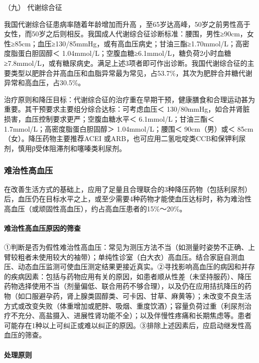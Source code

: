 \hypertarget{text00409.htmlux5cux23CHP17-3-1-8-9}{}
（九） 代谢综合征

我国代谢综合征患病率随着年龄增加而升高
，至65岁达高峰，50岁之前男性高于女性，而50岁之后则相反。我国成人代谢综合征诊断标准：腰围，男性≥90cm，女性≥85cm；血压≥130/85mmHg，或有高血压病史；甘油三酯≥1.70mmol/L；高密度脂蛋白胆固醇＜
1.04mmol/L；空腹血糖≥6.1mmol/L，糖负荷2小时血糖≥7.8mmol/L，或有糖尿病史。满足上述3项者即可作出诊断。我国代谢综合征的主要类型以肥胖合并高血压和血脂异常最为常见，占53.7\%，其次为肥胖合并糖代谢异常和高血压，占30.5\%。

治疗原则和降压目标：代谢综合征的治疗重在早期干预，健康膳食和合理运动甚为重要。其干预要求主要组分综合达标：可考虑血压＜
130/80mmHg，如合并肾脏损害，血压控制要求更严；空腹血糖水平＜
6.1mmol/L；甘油三酯＜ 1.7mmol/L；高密度脂蛋白胆固醇＞ 1.04mmol/L；腰围＜
90cm（男）或＜ 85cm（女）。降压药物主要推荐ACEI
或ARB，也可应用二氢吡啶类CCB和保钾利尿剂，慎用β受体阻滞剂和噻嗪类利尿剂。

\subsubsection{难治性高血压}

在改善生活方式的基础上，应用了足量且合理联合的3种降压药物（包括利尿剂）后，血压仍在目标水平之上，或至少需要4种药物才能使血压达标时，称为难治性高血压（或顽固性高血压），约占高血压患者的15\%～20\%。

\paragraph{难治性高血压原因的筛查}

①判断是否为假性难治性高血压：常见为测压方法不当（如测量时姿势不正确、上臂较粗者未使用较大的袖带）；单纯性诊室（白大衣）高血压。结合家庭自测血压、动态血压监测可使血压测定结果更接近真实。②寻找影响高血压的病因和并存的疾病因素：包括与药物应用有关的原因，如患者顺从性差（未坚持服药）、降压药物选择使用不当（剂量偏低、联合用药不够合理），以及仍在应用拮抗降压的药物（如口服避孕药，肾上腺类固醇类、可卡因、甘草、麻黄等）；未改变不良生活方式或改变失败（体重增加或肥胖、吸烟、重度饮酒）；容量负荷过重（利尿剂治疗不充分、高盐摄入、进展性肾功能不全）；以及伴慢性疼痛和长期焦虑等。患者可能存在1种以上可纠正或难以纠正的原因。③排除上述因素后，应启动继发性高血压的筛查。

\paragraph{处理原则}

